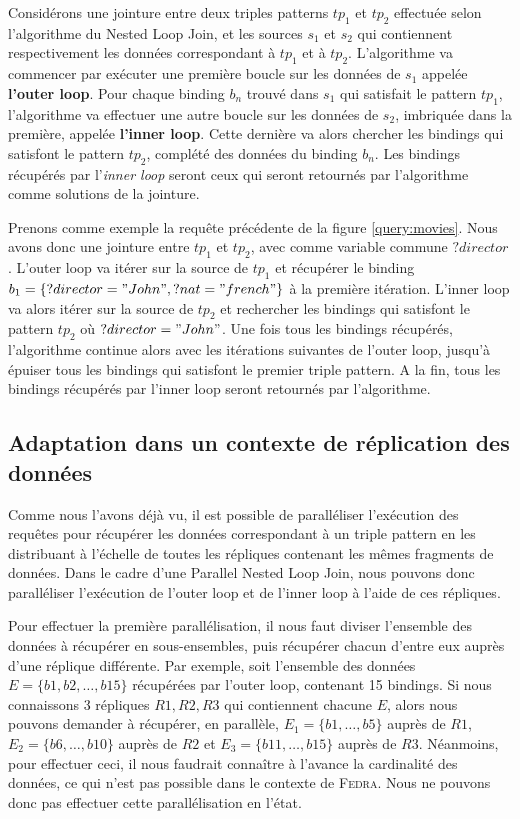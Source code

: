 \documentclass[a4paper]{article}
\def\fedra{\textsc{Fedra}\xspace}
\begin{document}
Considérons une jointure entre deux triples patterns $tp_1$ et $tp_2$ effectuée selon l'algorithme du Nested Loop Join, et les sources $s_1$ et $s_2$ qui contiennent respectivement les données correspondant à $tp_1$ et à $tp_2$. L'algorithme va commencer par exécuter une première boucle sur les données de $s_1$ appelée \textbf{l'outer loop}. Pour chaque binding $b_n$ trouvé dans $s_1$ qui satisfait le pattern $tp_1$, l'algorithme va effectuer une autre boucle sur les données de $s_2$, imbriquée dans la première, appelée \textbf{l'inner loop}. Cette dernière va alors chercher les bindings qui satisfont le pattern $tp_2$, complété des données du binding $b_n$. Les bindings récupérés par l'\textit{inner loop} seront ceux qui seront retournés par l'algorithme comme solutions de la jointure.

Prenons comme exemple la requête précédente de la figure \ref{query:movies}. Nous avons donc une jointure entre $tp_1$ et $tp_2$, avec comme variable commune $?director$. L'outer loop va itérer sur la source de $tp_1$ et récupérer le binding $b_1 = \{ ?director = "John", ?nat = "french" \}$ à la première itération. L'inner loop va alors itérer sur la source de $tp_2$ et rechercher les bindings qui satisfont le pattern $tp_2$ où $?director = "John"$. Une fois tous les bindings récupérés, l'algorithme continue alors avec les itérations suivantes de l'outer loop, jusqu'à épuiser tous les bindings qui satisfont le premier triple pattern. A la fin, tous les bindings récupérés par l'inner loop seront retournés par l'algorithme.

\subsection{Adaptation dans un contexte de réplication des données}

Comme nous l'avons déjà vu, il est possible de paralléliser l'exécution des requêtes pour récupérer les données correspondant à un triple pattern en les distribuant à l'échelle de toutes les répliques contenant les mêmes fragments de données. Dans le cadre d'une Parallel Nested Loop Join, nous pouvons donc paralléliser l'exécution de l'outer loop et de l'inner loop à l'aide de ces répliques.

Pour effectuer la première parallélisation, il nous faut diviser l'ensemble des données à récupérer en sous-ensembles, puis récupérer chacun d'entre eux auprès d'une réplique différente. Par exemple, soit l'ensemble des données $E = \{ b1, b2, \dots, b15 \}$ récupérées par l'outer loop, contenant 15 bindings. Si nous connaissons 3 répliques $R1, R2, R3$ qui contiennent chacune $E$, alors nous pouvons demander à récupérer, en parallèle, $E_1 = \{ b1, \dots, b5 \}$ auprès de $R1$, $E_2 = \{ b6, \dots, b10 \}$ auprès de $R2$ et $E_3 = \{ b11, \dots, b15 \}$ auprès de $R3$. Néanmoins, pour effectuer ceci, il nous faudrait connaître à l'avance la cardinalité des données, ce qui n'est pas possible dans le contexte de \fedra. Nous ne pouvons donc pas effectuer cette parallélisation en l'état.
\end{document}
